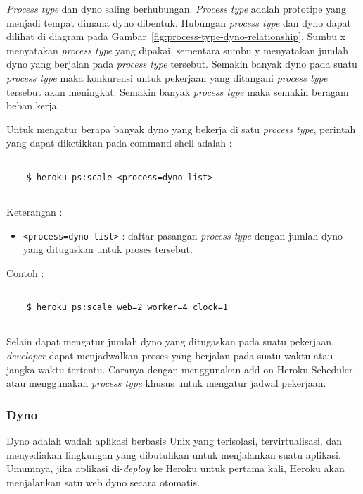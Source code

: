 \textit{Process type} dan dyno saling berhubungan. \textit{Process type} adalah prototipe yang menjadi tempat dimana dyno dibentuk. Hubungan \textit{process type} dan dyno dapat dilihat di diagram pada Gambar~\ref{fig:process-type-dyno-relationship}. Sumbu x menyatakan \textit{process type} yang dipakai, sementara sumbu y menyatakan jumlah dyno yang berjalan pada \textit{process type} tersebut. Semakin banyak dyno pada suatu \textit{process type} maka konkurensi untuk pekerjaan yang ditangani \textit{process type} tersebut akan meningkat. Semakin banyak \textit{process type} maka semakin beragam beban kerja.

Untuk mengatur berapa banyak dyno yang bekerja di satu \textit{process type}, perintah yang dapat diketikkan pada command shell adalah :
\begin{lstlisting}

	$ heroku ps:scale <process=dyno list>
	
\end{lstlisting}
Keterangan :
\begin{itemize}
\item \texttt{<process=dyno list>} : daftar pasangan \textit{process type} dengan jumlah dyno yang ditugaskan untuk proses tersebut.
\end{itemize}

Contoh : 
\begin{lstlisting}

	$ heroku ps:scale web=2 worker=4 clock=1
	
\end{lstlisting}

Selain dapat mengatur jumlah dyno yang ditugaskan pada suatu pekerjaan, \textit{developer} dapat menjadwalkan proses yang berjalan pada suatu waktu atau jangka waktu tertentu. Caranya dengan menggunakan add-on Heroku Scheduler atau menggunakan \textit{process type} khusus untuk mengatur jadwal pekerjaan.

\subsubsection{Dyno}
Dyno adalah wadah aplikasi berbasis Unix yang terisolasi, tervirtualisasi, dan menyediakan lingkungan yang dibutuhkan untuk menjalankan suatu aplikasi. Umumnya, jika aplikasi di-\textit{deploy} ke Heroku untuk pertama kali, Heroku akan menjalankan satu web dyno secara otomatis.

